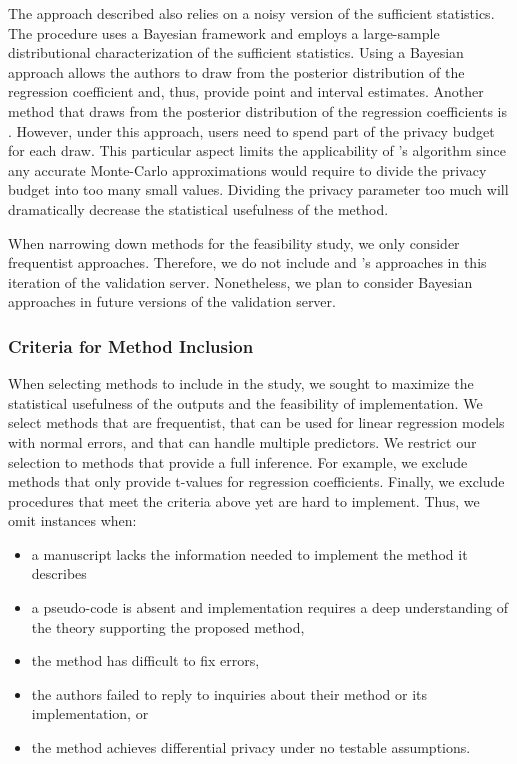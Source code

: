 The approach described \citet{bernstein2019differentially} also relies on a noisy version of the sufficient statistics. The procedure uses a Bayesian framework and employs a large-sample distributional characterization of the sufficient statistics. Using a Bayesian approach allows the authors to draw from the posterior distribution of the regression coefficient and, thus, provide point and interval estimates. Another method that draws from the posterior distribution of the regression coefficients is \citet{wang2018revisiting}. However, under this approach, users need to spend part of the privacy budget for each draw. This particular aspect limits the applicability of \citet{wang2018revisiting}'s algorithm since any accurate Monte-Carlo approximations would require to divide the privacy budget into too many small values. Dividing the privacy parameter too much will dramatically decrease the statistical usefulness of the method.

When narrowing down methods for the feasibility study, we only consider frequentist approaches. Therefore, we do not include \citet{bernstein2019differentially} and \citet{wang2018revisiting}'s approaches in this iteration of the validation server. Nonetheless, we plan to consider Bayesian approaches in future versions of the validation server.

\subsubsection{Criteria for Method Inclusion}

When selecting methods to include in the study, we sought to maximize the statistical usefulness of the outputs and the feasibility of implementation. We select methods that are frequentist, that can be used for linear regression models with normal errors, and that can handle multiple predictors. We restrict our selection to methods that provide a full inference. For example, we exclude methods that only provide t-values for regression coefficients. Finally, we exclude procedures that meet the criteria above yet are hard to implement. Thus, we omit instances when: 
\begin{itemize}
    \item a manuscript lacks the information needed to implement the method it describes
    \item a pseudo-code is absent and implementation requires a deep understanding of the theory supporting the proposed method,
    \item the method has difficult to fix errors,
    \item the authors failed to reply to inquiries about their method or its implementation, or
    \item the method achieves differential privacy under no testable assumptions.
\end{itemize}

